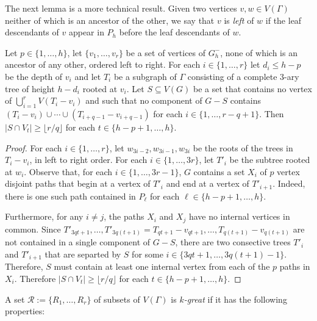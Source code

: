 \documentclass{patmorin}
\newcommand{\defin}[1]{\emph{\color{brightmaroon}#1}}
\begin{document}


The next lemma is a more technical result.  Given two vertices $v,w\in V(\Gamma)$ neither of which is an ancestor of the other, we say that $v$ is \defin{left} of $w$ if the leaf descendants of $v$ appear in $P_h$ before the leaf descendants of $w$.

\begin{lem}\label{subtree_splitting}
  Let $p\in\{1,\ldots,h\}$, let $\{v_1,\ldots,v_r\}$ be a set of vertices of $G_h^-$, none of which is an ancestor of any other, ordered left to right.  For each $i\in\{1,\ldots,r\}$ let $d_i\le h-p$ be the depth of $v_i$ and let $T_i$ be a subgraph of $\Gamma$ consisting of a complete $3$-ary tree of height $h-d_i$ rooted at $v_i$.  Let $S\subseteq V(G)$ be a set that contains no vertex of $\bigcup_{i=1}^r V(T_i-v_i)$ and such that no component of $G-S$ contains $(T_i-v_i)\cup\cdots\cup (T_{i+q-1}-v_{i+q-1})$ for each $i\in\{1,\ldots,r-q+1\}$.  Then $|S\cap V_t|\ge \lfloor r/q\rfloor$ for each $t\in\{h-p+1,\ldots,h\}$.
\end{lem}

\begin{proof}
  For each $i\in\{1,\ldots,r\}$, let $w_{3i-2},w_{3i-1},w_{3i}$ be the roots of the trees in $T_i-v_i$, in left to right order.  For each $i\in\{1,\ldots,3r\}$, let $T'_i$ be the subtree rooted at $w_i$.  Observe that, for each $i\in\{1,\ldots,3r-1\}$, $G$ contains a set $X_{i}$ of $p$ vertex disjoint paths that begin at a vertex of $T'_{i}$ and end at a vertex of $T'_{i+1}$.  Indeed, there is one such path contained in $P_\ell$ for each $\ell\in\{h-p+1,\ldots,h\}$.

  Furthermore, for any $i\neq j$, the paths $X_i$ and $X_j$ have no internal vertices in common.  Since $T'_{3qt+1},\ldots,T'_{3q(t+1)}=T_{qt+1}-v_{qt+1},\ldots,T_{q(t+1)}-v_{q(t+1)}$ are not contained in a single component of $G-S$, there are two consective trees $T'_i$ and $T'_{i+1}$ that are separted by $S$ for some $i\in\{3qt+1,\ldots,3q(t+1)-1\}$.  Therefore, $S$ must contain at least one internal vertex from each of the $p$ paths in $X_{i}$.  Therefore $|S\cap V_t|\ge \lfloor r/q\rfloor$ for each $t\in\{h-p+1,\ldots,h\}$.
\end{proof}

A set $\mathcal{R}:=\{R_1,\ldots,R_r\}$ of subsets of $V(\Gamma)$ is \defin{$k$-great} if it has the following properties:
\end{document}
